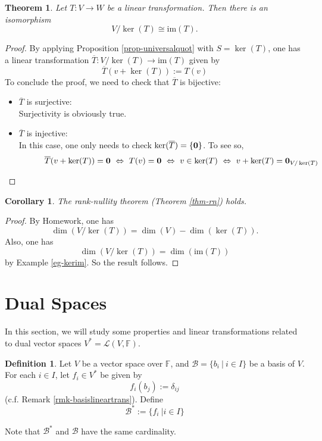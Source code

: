 \documentclass[11pt,openany]{book}
\theoremstyle{plain}
\newtheorem{theorem}{Theorem}[chapter]
\newtheorem{corollary}[corollary]{Corollary}
\theoremstyle{definition}
\newtheorem{definition}[definition]{Definition}
\theoremstyle{remark}
\begin{document}
\begin{theorem}
    Let $T: V \to W$ be a linear transformation. Then there is an isomorphism
    $$V/\ker(T) \cong \mathrm{im}(T).$$
\end{theorem}
    \begin{proof}
By applying Proposition \ref{prop-universalquot} with $S = \ker(T)$, one has a linear transformation $ \overline{T} : V/\ker(T) \to \mathrm{im}(T)$ given by $$ \overline{T}(v+\ker(T)):=T(v) $$
    To conclude the proof, we need to check that $\overline{T}$ is bijective:
    \begin{itemize}
        \item{$\overline{T}$ is surjective:} \\
            Surjectivity is obviously true.
        \item{$\overline{T}$ is injective:} \\
            In this case, one only needs to check $\ker(\overline{T}) = \{{\bf 0}\}$. To see so,
            \begin{align*}
            \quad \quad \quad \overline{T}(v+\ker(T)) = {\bf 0}\
            \Leftrightarrow\ T(v) = {\bf 0}\
            \Leftrightarrow\ v \in \ker(T)\ 
            \Leftrightarrow\ v + \ker(T) = {\bf 0}_{V/\ker(T)} \end{align*}
    \end{itemize}        
    \end{proof}

\begin{corollary}
    The rank-nullity theorem (Theorem \ref{thm-rn}) holds.
\end{corollary}    
\begin{proof}
    By Homework, one has $$\dim(V/\ker(T)) = \dim(V) - \dim(\ker(T)).$$ Also, one has $$\dim(V/\ker(T)) = \dim(\mathrm{im}(T))$$ by Example \ref{eg-kerim}. So the result follows.    
\end{proof}


\section{Dual Spaces}
In this section, we will study some properties and linear transformations related to dual vector spaces $V^* = \mathcal{L}(V,\mathbb{F})$. 

\begin{definition}
    Let $V$ be a vector space over $\mathbb{F}$, and $\mathcal{B} = \{b_i\ |\ i \in I\}$ be a basis of $V$. For each $i \in I$, let $f_i \in V^*$ be given by
    $$f_i(b_j) := \delta_{ij}$$
    (c.f. Remark \ref{rmk-basislineartrans}). Define
    $$\mathcal{B}^* := \{f_i\ | i \in I\}$$
\end{definition}
Note that $\mathcal{B}^*$ and $\mathcal{B}$ have the same cardinality.
\end{document}
